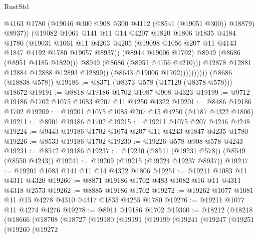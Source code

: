 \begin{lexlean}{RustStd}
\begin{coremodule}
                                @4163
                                @1780
                                (@19046 @300 @908 @300 @4112 (@8541 (@19051 @300)) @18879)
                                @8937))
                            (@19082
                              @1061
                              @141
                              @11
                              @14
                              @4207
                              @1820
                              @1806
                              @1835
                              @4184
                              @1780
                              (@19031
                                @1061
                                @11
                                @4203
                                @4205
                                (@19098 @1056 @207 @11 @4143 @1847 @4192 @1780 @19057 @8937))
                              (@8944 @19006 @1702)
                              @8949
                              (@8686 (@8951 @4185 @1820)))
                            @8949
                            (@8686 (@8951 @4156 @4210)))
                          @12878
                          @12881
                          @12884
                          @12888
                          @12893
                          @12899))
                      (@8643 @19006 @1702))))))))))
    (@8686 (@18838 @578))
@19186 := @8371 (@8373 @578 (@17129 (@8378 @578))) @18672
@19191 := @8818 @19186 @1702 @1087 @908 @4323
@19199 := @9712 @19186 @1702 @1075 @1083 @207 @11 @4250 @4322
@19201 := @8486 @19186 @1702
@19209 := @19201 @1075 @1085 @207 @15 @4250 (@1787 @4322 @1806)
@19211 := @8901 @19186 @1702
@19215 := @19211 @1075 @207 @4246 @4248
@19224 := @9443 @19186 @1702 @1074 @207 @11 @4243 @1847 @4235 @1780
@19226 := @8533 @19186 @1702
@19230 := @19226 @578 @908 @578 @4243
@19231 := @8542 @19186
@19237 := @19230 (@8541 (@19231 @578)) (@8549 (@8550 @4243))
@19241 := @19209 (@19215 (@19224 @19237 @8937))
@19247 := @19201 @1083 @141 @11 @14 @4322 @1806
@19251 := @19211 @1083 @11 @4311 @4320
@19260 := @8871 @19186 @1702 @483 @1082 @16 @11 @4311 @4318 @2573
@19262 := @8885 @19186 @1702
@19272 := @19262 @1077 @1081 @11 @15 @4278 @4310 @4317 @1835 @4255 @1780
@19276 := @19211 @1077 @11 @4274 @4276
@19278 := @8911 @19186 @1702
@19360 := @18212
    (@18218
      (@18666
        (@18708
          (@18727
            (@19180
              (@19191
                (@19199
                  (@19241
                    (@19247
                      (@19251
                        (@19260
                          (@19272

\end{coremodule}
\end{lexlean}
